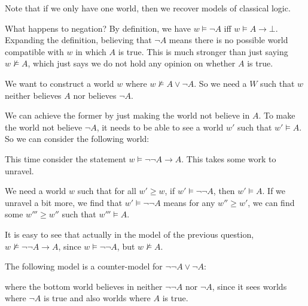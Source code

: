 \documentclass[a4paper]{article}
\begin{document}
Note that if we only have one world, then we recover models of classical logic.

What happens to negation? By definition, we have $w \vDash \neg A$ iff $w \vDash A \to \bot$. Expanding the definition, believing that $\neg A$ means there is no possible world compatible with $w$ in which $A$ is true. This is much stronger than just saying $w \not\vDash A$, which just says we do not hold any opinion on whether $A$ is true.

\begin{eg}
  We want to construct a world $w$ where $w \not \vDash A\vee \neg A$. So we need a $W$ such that $w$ neither believes $A$ nor believes $\neg A$.

  We can achieve the former by just making the world not believe in $A$. To make the world not believe $\neg A$, it needs to be able to see a world $w'$ such that $w' \vDash A$. So we can consider the following world:
  \begin{center}
  \end{center}
\end{eg}

\begin{eg}
  This time consider the statement $w \vDash \neg \neg A \to A$. This takes some work to unravel.

  We need a world $w$ such that for all $w' \geq w$, if $w' \vDash \neg \neg A$, then $w' \vDash A$. If we unravel a bit more, we find that $w' \vDash \neg \neg A$ means for any $w'' \geq w'$, we can find some $w''' \geq w''$ such that $w''' \vDash A$.

  It is easy to see that actually in the model of the previous question, $w \not\vDash \neg \neg A \to A$, since $w \vDash \neg \neg A$, but $w \not\vDash A$.
\end{eg}

\begin{eg}
  The following model is a counter-model for $\neg \neg A \vee \neg A$:
  \begin{center}
  \end{center}
  where the bottom world believes in neither $\neg \neg A$ nor $\neg A$, since it sees worlds where $\neg A$ is true and also worlds where $A$ is true.
\end{eg}
\end{document}

